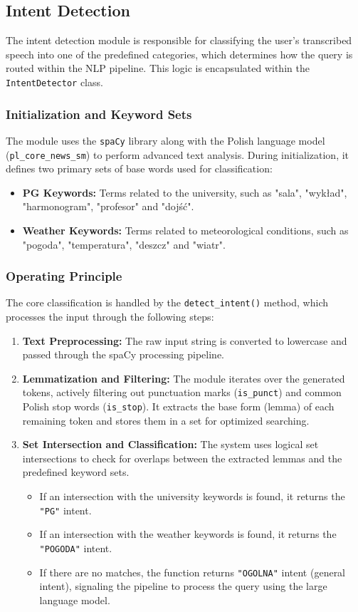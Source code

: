 \documentclass{article}
\begin{document}
	\subsection{Intent Detection}
	The intent detection module is responsible for classifying the user's transcribed speech into one of the predefined categories, which determines how the query is routed within the NLP pipeline. This logic is encapsulated within the \texttt{IntentDetector} class.
	
	\subsubsection*{Initialization and Keyword Sets}
	The module uses the \texttt{spaCy} library along with the Polish language model (\texttt{pl\_core\_news\_sm}) to perform advanced text analysis. During initialization, it defines two primary sets of base words used for classification:
	\begin{itemize}
		\item \textbf{PG Keywords:} Terms related to the university, such as "sala", "wykład", "harmonogram", "profesor" and "dojść".
		\item \textbf{Weather Keywords:} Terms related to meteorological conditions, such as "pogoda", "temperatura", "deszcz" and "wiatr".
	\end{itemize}
	
	\subsubsection*{Operating Principle}
	The core classification is handled by the \texttt{detect\_intent()} method, which processes the input through the following steps:
	\begin{enumerate}
		\item \textbf{Text Preprocessing:} The raw input string is converted to lowercase and passed through the spaCy processing pipeline.
		\item \textbf{Lemmatization and Filtering:} The module iterates over the generated tokens, actively filtering out punctuation marks (\texttt{is\_punct}) and common Polish stop words (\texttt{is\_stop}). It extracts the base form (lemma) of each remaining token and stores them in a set for optimized searching.
		\item \textbf{Set Intersection and Classification:} The system uses logical set intersections to check for overlaps between the extracted lemmas and the predefined keyword sets. 
		\begin{itemize}
			\item If an intersection with the university keywords is found, it returns the \texttt{"PG"} intent.
			\item If an intersection with the weather keywords is found, it returns the \texttt{"POGODA"} intent.
			\item If there are no matches, the function returns \texttt{"OGOLNA"} intent (general intent), signaling the pipeline to process the query using the large language model.
		\end{itemize}
	\end{enumerate}
	
\end{document}
